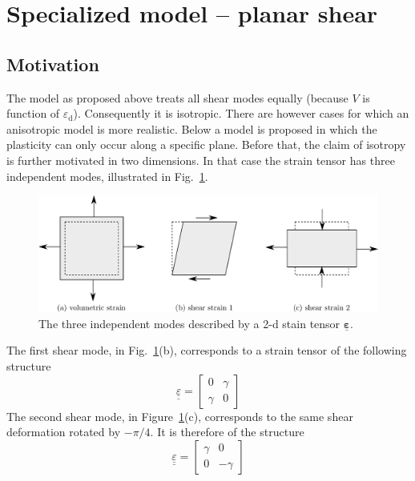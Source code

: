 \documentclass[times,namecite]{goose-article}
\newcommand\T[1]{\underline{\bm{{#1}}}}
\begin{document}
\section{Specialized model -- planar shear}

\subsection{Motivation}

The model as proposed above treats all shear modes equally (because $V$ is function of $\varepsilon_\mathrm{d}$). Consequently it is isotropic. There are however cases for which an anisotropic model is more realistic. Below a model is proposed in which the plasticity can only occur along a specific plane. Before that, the claim of isotropy is further motivated in two dimensions. In that case the strain tensor has three independent modes, illustrated in Fig.~\ref{fig:strain-modes:2d}.

\begin{figure}[htp]
  \centering
  \includegraphics[width=.7\textwidth]{figures/strain-modes_2d}
  \caption{The three independent modes described by a 2-d stain tensor $\T{\varepsilon}$.}
  \label{fig:strain-modes:2d}
\end{figure}

The first shear mode, in Fig.~\ref{fig:strain-modes:2d}(b), corresponds to a strain tensor of the following structure
\begin{equation} \label{eq:strain-modes:basic}
  \underline{\underline{\varepsilon}}
  =
  \begin{bmatrix}
    0      & \gamma \\
    \gamma &  0
  \end{bmatrix}
\end{equation}
The second shear mode, in Figure~\ref{fig:strain-modes:2d}(c), corresponds to the same shear deformation rotated by $-\pi/4$. It is therefore of the structure
\begin{equation}
  \underline{\underline{\varepsilon}}
  =
  \begin{bmatrix}
    \gamma &  0      \\
     0     & -\gamma
  \end{bmatrix}
\end{equation}
\end{document}
